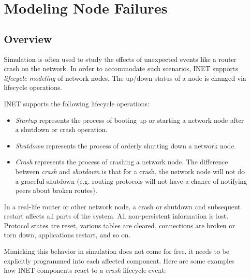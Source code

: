 \chapter{Modeling Node Failures}
\label{cha:lifecycle}

\section{Overview}
\label{sec:lifecycle:overview}

Simulation is often used to study the effects of unexpected events like
a router crash on the network. In order to accommodate such scenarios, INET
supports \textit{lifecycle modeling} of network nodes. The up/down
status of a node is changed via lifecycle operations.

INET supports the following lifecycle operations:

\begin{itemize}
  \item \textit{Startup} represents the process of booting up or starting
    a network node after a shutdown or crash operation.
  \item \textit{Shutdown} represents the process of orderly shutting down
    a network node.
  \item \textit{Crash} represents the process of crashing a network node.
    The difference between \textit{crash} and \textit{shutdown} is that
    for a crash, the network node will not do a graceful shutdown (e.g.
    routing protocols will not have a chance of notifying peers about
    broken routes).
\end{itemize}

In a real-life router or other network node, a crash or shutdown and
subsequent restart affects all parts of the system. All non-persistent
information is lost. Protocol states are reset, various tables are cleared,
connections are broken or torn down, applications restart, and so on.

Mimicking this behavior in simulation does not come for free, it
needs to be explicitly programmed into each affected component.
Here are some examples how INET components react to a \textit{crash}
lifecycle event:

